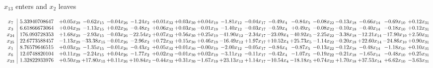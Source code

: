 \documentclass[9pt]{article}
\begin{document}
 $ x_{13} $ enters and $ x_{2} $ leaves 

 \[\begin{array}{c| c c@{\hskip 2pt} c@{\hskip 2pt} c@{\hskip 2pt} c@{\hskip 2pt} c@{\hskip 2pt} c@{\hskip 2pt} c@{\hskip 2pt} c@{\hskip 2pt} c@{\hskip 2pt} c@{\hskip 2pt} c@{\hskip 2pt} c@{\hskip 2pt} c@{\hskip 2pt} c@{\hskip 2pt} c@{\hskip 2pt} c@{\hskip 2pt} }
 x_{7}   &  5.33940708647 & +  0.05 x_{29} & -0.62 x_{15} & -0.04 x_{26} & -1.24 x_{2} & +  0.01 x_{32} & +  0.03 x_{30} & +  0.04 x_{19} & -1.81 x_{12} & -0.04 x_{17} & -0.49 x_{4} & -0.84 x_{5} & -0.08 x_{22} & -0.13 x_{18} & -0.66 x_{14} & -0.69 x_{10} & +  0.12 x_{31}\\
 x_{3}   &  6.61866673064 & +  0.04 x_{29} & -1.13 x_{15} & +  0.02 x_{26} & -0.48 x_{2} & +  0.06 x_{32} & +  0.03 x_{30} & -0.01 x_{19} & -1.40 x_{12} & -0.03 x_{17} & -0.59 x_{4} & +  0.49 x_{5} & -0.08 x_{22} & -0.10 x_{18} & -0.40 x_{14} & -0.18 x_{10} & +  0.12 x_{31}\\
 x_{24}   &  176.093728353 & +  1.68 x_{29} & -2.93 x_{15} & -0.03 x_{26} & -22.54 x_{2} & +  0.07 x_{32} & +  0.56 x_{30} & +  0.25 x_{19} & -41.90 x_{12} & -2.34 x_{17} & -23.09 x_{4} & -40.92 x_{5} & -2.25 x_{22} & -3.38 x_{18} & -12.21 x_{14} & -17.90 x_{10} & +  2.50 x_{31}\\
 x_{25}   &  22.6773588457 & -1.13 x_{29} & -33.38 x_{15} & -0.01 x_{26} & -2.96 x_{2} & +  0.72 x_{32} & +  0.15 x_{30} & +  0.46 x_{19} & -16.49 x_{12} & +  1.97 x_{17} & + 10.52 x_{4} & + 25.73 x_{5} & -1.14 x_{22} & -0.20 x_{18} & + 22.60 x_{14} & -24.86 x_{10} & +  0.90 x_{31}\\
 x_{1}   &  8.76579646515 & +  0.03 x_{29} & -1.35 x_{15} & -0.01 x_{26} & -0.43 x_{2} & +  0.05 x_{32} & +  0.01 x_{30} & -0.00 x_{19} & -2.00 x_{12} & -0.05 x_{17} & -0.84 x_{4} & -0.87 x_{5} & -0.13 x_{22} & -0.12 x_{18} & -0.48 x_{14} & -1.18 x_{10} & +  0.10 x_{31}\\
 x_{6}   &  12.0748820104 & +  0.11 x_{29} & -2.24 x_{15} & +  0.04 x_{26} & -1.77 x_{2} & +  0.02 x_{32} & -0.01 x_{30} & +  0.02 x_{19} & -3.11 x_{12} & -0.11 x_{17} & -0.42 x_{4} & -1.07 x_{5} & -0.19 x_{22} & -0.21 x_{18} & -1.65 x_{14} & -0.48 x_{10} & +  0.25 x_{31}\\
 x_{23}   &  1.32822933976 & +  0.50 x_{29} & + 17.80 x_{15} & +  0.11 x_{26} & + 10.84 x_{2} & -0.44 x_{32} & +  0.31 x_{30} & -1.67 x_{19} & + 23.13 x_{12} & +  1.14 x_{17} & -10.54 x_{4} & -18.18 x_{5} & +  0.74 x_{22} & +  1.70 x_{18} & + 37.53 x_{14} & +  6.62 x_{10} & -3.63 x_{31}\\

\end{array}\]
\end{document}
